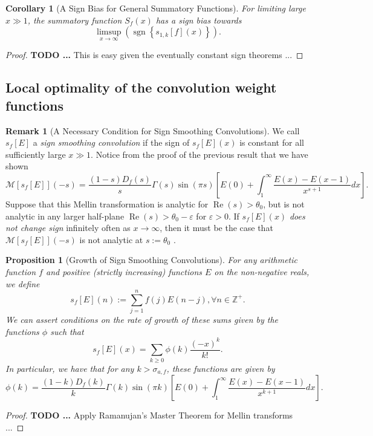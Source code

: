 \documentclass[11pt,reqno]{amsart}
\numberwithin{figure}{section}
\numberwithin{table}{section}
\let\citep\cite
\newcommand{\cf}{\textit{cf.\ }}
\newcommand{\floor}[1]{\left\lfloor #1 \right\rfloor}
\DeclareMathOperator{\sgn}{sgn}
\renewcommand{\Re}{\operatorname{Re}}
\theoremstyle{plain}
\newtheorem{prop}[theorem]{Proposition}
\newtheorem{cor}[theorem]{Corollary}
\numberwithin{theorem}{section}
\theoremstyle{definition}
\newtheorem{remark}[theorem]{Remark}
\begin{document}
\begin{cor}[A Sign Bias for General Summatory Functions]
For limiting large $x \gg 1$, the summatory function $S_f(x)$ has a sign bias towards 
\[
\limsup_{x \rightarrow \infty} \left(\sgn\left\{s_{1,k}[f](x)\right\}\right). 
\]
\end{cor}
\begin{proof}
\textbf{TODO ... } This is easy given the eventually constant sign theorems ... 
\end{proof} 

\subsection{Local optimality of the convolution weight functions} 

\begin{remark}[A Necessary Condition for Sign Smoothing Convolutions] 
We call $s_f[E]$ a \emph{sign smoothing convolution} if the sign of $s_f[E](x)$ is 
constant for all sufficiently large $x \gg 1$. 
Notice from the proof of the previous result that we have shown
\[
\mathcal{M}[s_f[E]](-s) = \frac{(1-s) D_f(s)}{s} \Gamma(s) \sin(\pi s) \left[ 
     E(0) + \int_1^{\infty} \frac{E(x)-E(x-1)}{x^{s+1}} dx 
     \right]. 
\]
Suppose that this Mellin transformation is analytic for $\Re(s) > \theta_0$, but is not 
analytic in any larger half-plane $\Re(s) > \theta_0-\varepsilon$ for $\varepsilon>0$. 
If $s_f[E](x)$ \emph{does not change sign} 
infinitely often as $x \rightarrow \infty$, then it must 
be the case that $\mathcal{M}[s_f[E]](-s)$ is not analytic at $s := \theta_0$ 
\citep[\cf Landau's Theorem]{OSCPROPS-ARITHFUNCSI}. 
\end{remark} 

\begin{prop}[Growth of Sign Smoothing Convolutions]
For any arithmetic function $f$ and positive (strictly increasing) functions $E$ on the non-negative reals, 
we define 
\[
s_f[E](n) := \sum_{j=1}^{n} f(j) E(n-j), \forall n \in \mathbb{Z}^{+}. 
\] 
We can assert conditions on the rate of growth of these sums given by the functions $\phi$ such 
that $$s_f[E](x) = \sum_{k \geq 0} \phi(k) \frac{(-x)^{k}}{k!}.$$ In particular, we have that 
for any $k > \sigma_{a,f}$, these functions are given by 
\[
\phi(k) = \frac{(1-k) D_f(k)}{k} \Gamma(k) \sin(\pi k) \left[ 
     E(0) + \int_1^{\infty} \frac{E(x)-E(x-1)}{x^{k+1}} dx 
     \right]. 
\] 
\end{prop} 
\begin{proof} 
\textbf{TODO ... } Apply Ramanujan's Master Theorem for Mellin transforms ... 
\end{proof} 
\end{document}
